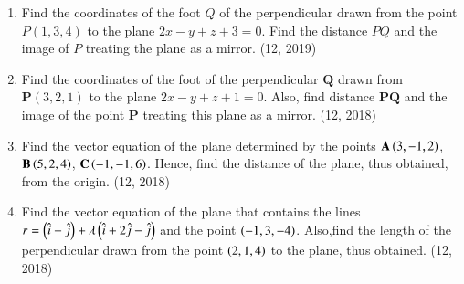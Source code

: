 \begin{enumerate}[label=\thesubsection.\arabic*, ref=\thesubsection.\theenumi]
	\item Find the coordinates of the foot $Q$ of the perpendicular drawn from the point $P(1, 3, 4)$ to the plane $2x - y + z + 3 = 0$. Find the distance $PQ$ and the image of $P$ treating the plane as a mirror. \hfill (12, 2019)
\item Find the coordinates of the foot of the perpendicular $\mathbf{Q}$ drawn from $\mathbf{P}(3, 2, 1)$ to the plane $2x - y + z + 1 = 0$. Also, find distance $\mathbf{PQ}$ and the image of the point $\mathbf{P}$ treating this plane as a mirror.
\hfill (12, 2018)
\item Find the vector equation of the plane determined by the points $\mathbf{A}\left(3,-1,2\right)$, $\mathbf{B}\left(5,2,4\right)$, $\mathbf{C}\left(-1,-1,6\right)$. Hence, find the distance of the plane, thus obtained, from the origin.
\hfill (12, 2018)
\item Find the vector equation of the plane that contains the lines $r=\left(\hat{i}+\hat{j}\right)+\lambda \left(\hat{i}+2\hat{j} - \hat{j}\right)$ and the point $\left(-1,3,-4\right)$. Also,find the length of the perpendicular drawn from the point $\left(2,1,4\right)$ to the plane, thus obtained.
\hfill (12, 2018) 
	

\end{enumerate}
